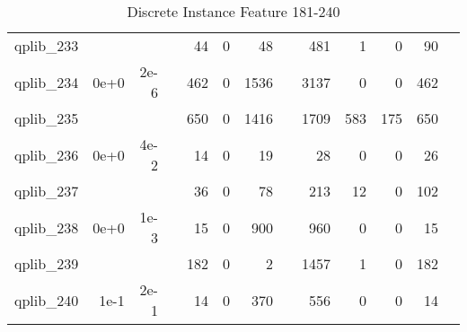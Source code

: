 \begin{table}
\begin{tabular}{lrrrrrrrrrrrr}
qplib\_233	&		&		&	&	44	&	0	&	48	&	&	481	&	1	&	0	&	90	\\
qplib\_234	&	0e+0	&	2e-6	&	&	462	&	0	&	1536	&	&	3137	&	0	&	0	&	462	\\
qplib\_235	&		&		&	&	650	&	0	&	1416	&	&	1709	&	583	&	175	&	650	\\
qplib\_236	&	0e+0	&	4e-2	&	&	14	&	0	&	19	&	&	28	&	0	&	0	&	26	\\
qplib\_237	&		&		&	&	36	&	0	&	78	&	&	213	&	12	&	0	&	102	\\
qplib\_238	&	0e+0	&	1e-3	&	&	15	&	0	&	900	&	&	960	&	0	&	0	&	15	\\
qplib\_239	&		&		&	&	182	&	0	&	2	&	&	1457	&	1	&	0	&	182	\\
qplib\_240	&	1e-1	&	2e-1	&	&	14	&	0	&	370	&	&	556	&	0	&	0	&	14	\\


\bottomrule

\end{tabular}  
\label{tab:A4}
\caption{Discrete  Instance Feature 181-240} 

\end{table}

